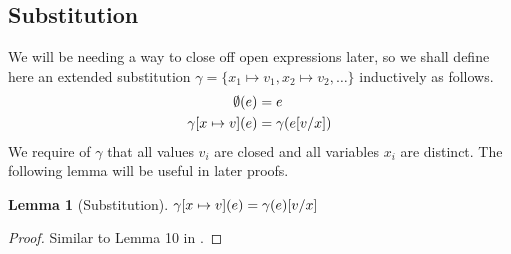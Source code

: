 \documentclass[a4paper, 11pt]{report}
\newtheorem{lemma}[theorem]{Lemma}
\theoremstyle{definition}
\newcommand{\var}{x}
\newcommand{\expr}{e}
\newcommand{\val}{v}
\newcommand{\elctx}{K}
\newcommand{\subst}[3]{#1{\left[#3 \middle/ #2 \right]}}
\newcommand{\stepS}{\rightarrow^*}
\newcommand{\Val}[1]{\mathrm{Val}(#1)}
\newcommand{\map}[2]{#1 \mapsto #2}
\begin{document}

\subsection{Substitution}
We will be needing a way to close off open expressions later, so we shall define here an extended substitution $\gamma = \{\map{\var_1}{\val_1}, \map{\var_2}{\val_2}, \dots\}$ inductively as follows.
\begin{align*}
  \emptyset(\expr) &= \expr\\
  \gamma[\map{\var}{\val}](\expr) &= \gamma(\subst{\expr}{\var}{\val})
\end{align*}
We require of $\gamma$ that all values $\val_i$ are closed and all variables $\var_i$ are distinct. The following lemma will be useful in later proofs.
\begin{lemma}[Substitution]\label{lem:sub}
  $\gamma[\map{\var}{\val}](\expr) = \subst{\gamma(\expr)}{\var}{\val}$
\end{lemma}
\begin{proof}
  Similar to Lemma 10 in \cite{DBLP:journals/corr/abs-1907-11133}.
\end{proof}
\end{document}
